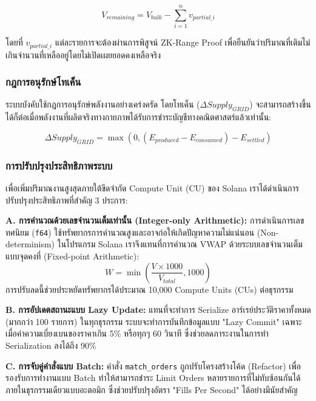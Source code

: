 \documentclass[conference,10pt]{IEEEtran}
\begin{document}
\begin{equation}
V_{remaining} = V_{bulk} - \sum_{i=1}^{n} v_{partial\_i}
\end{equation}

โดยที่ $v_{partial\_i}$ แต่ละรายการจะต้องผ่านการพิสูจน์ ZK-Range Proof เพื่อยืนยันว่าปริมาณที่เติมไม่เกินจำนวนที่เหลืออยู่โดยไม่เปิดเผยยอดคงเหลือจริง

\subsubsection{กฎการอนุรักษ์โทเค็น}
ระบบบังคับใช้กฎการอนุรักษ์พลังงานอย่างเคร่งครัด โดยโทเค็น ($\Delta Supply_{GRID}$) จะสามารถสร้างขึ้นได้ก็ต่อเมื่อพลังงานที่ผลิตจริงทางกายภาพได้รับการชำระบัญชีทางคณิตศาสตร์แล้วเท่านั้น:

\begin{equation}
\Delta Supply_{GRID} = \max(0, (E_{produced} - E_{consumed}) - E_{settled})
\end{equation}

\subsubsection{การปรับปรุงประสิทธิภาพระบบ}
เพื่อเพิ่มปริมาณงานสูงสุดภายใต้ขีดจำกัด Compute Unit (CU) ของ Solana เราได้ดำเนินการปรับปรุงประสิทธิภาพที่สำคัญ 3 ประการ:

\textbf{A. การคำนวณด้วยเลขจำนวนเต็มเท่านั้น (Integer-only Arithmetic):} 
การดำเนินการเลขทศนิยม (\texttt{f64}) ใช้ทรัพยากรการคำนวณสูงและอาจก่อให้เกิดปัญหาความไม่แน่นอน (Non-determinism) ในโปรแกรม Solana เราจึงแทนที่การคำนวณ VWAP ด้วยระบบเลขจำนวนเต็มแบบจุดคงที่ (Fixed-point Arithmetic):
\begin{equation}
W = \min\left(\frac{V \times 1000}{V_{total}}, 1000\right)
\end{equation}
การปรับลดนี้ช่วยประหยัดทรัพยากรได้ประมาณ 10,000 Compute Units (CUs) ต่อธุรกรรม

\textbf{B. การอัปเดตสถานะแบบ Lazy Update:}
แทนที่จะทำการ Serialize อาร์เรย์ประวัติราคาทั้งหมด (มากกว่า 100 รายการ) ในทุกธุรกรรม ระบบจะทำการบันทึกข้อมูลแบบ "Lazy Commit" เฉพาะเมื่อค่าความเบี่ยงเบนของราคาเกิน 5\% หรือทุกๆ 60 วินาที ซึ่งช่วยลดภาระงานในการทำ Serialization ลงได้ถึง 90\%

\textbf{C. การจับคู่คำสั่งแบบ Batch:}
คำสั่ง \texttt{match\_orders} ถูกปรับโครงสร้างโค้ด (Refactor) เพื่อรองรับการทำงานแบบ Batch ทำให้สามารถชำระ Limit Orders หลายรายการที่ไม่ทับซ้อนกันได้ภายในธุรกรรมเดียวแบบอะตอมิก ซึ่งช่วยปรับปรุงอัตรา "Fills Per Second" ได้อย่างมีนัยสำคัญ
\end{document}
